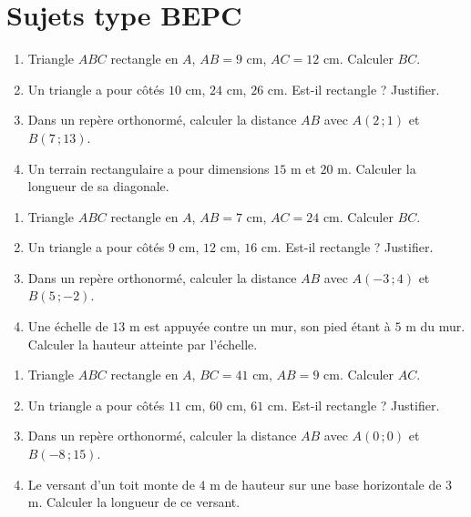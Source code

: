 \section{Sujets type BEPC}

\begin{enumerate}[label=\arabic*)]
\item Triangle $ABC$ rectangle en $A$, $AB=9$ cm, $AC=12$ cm. Calculer $BC$.
\item Un triangle a pour côtés $10$ cm, $24$ cm, $26$ cm. Est-il rectangle ? Justifier.
\item Dans un repère orthonormé, calculer la distance $AB$ avec $A(2\,;1)$ et
$B(7\,;13)$.
\item Un terrain rectangulaire a pour dimensions $15$ m et $20$ m. Calculer la longueur de
sa diagonale.
\end{enumerate}

\begin{enumerate}[label=\arabic*)]
\item Triangle $ABC$ rectangle en $A$, $AB=7$ cm, $AC=24$ cm. Calculer $BC$.
\item Un triangle a pour côtés $9$ cm, $12$ cm, $16$ cm. Est-il rectangle ? Justifier.
\item Dans un repère orthonormé, calculer la distance $AB$ avec $A(-3\,;4)$ et
$B(5\,;-2)$.
\item Une échelle de $13$ m est appuyée contre un mur, son pied étant à $5$ m du mur.
Calculer la hauteur atteinte par l'échelle.
\end{enumerate}

\begin{enumerate}[label=\arabic*)]
\item Triangle $ABC$ rectangle en $A$, $BC=41$ cm, $AB=9$ cm. Calculer $AC$.
\item Un triangle a pour côtés $11$ cm, $60$ cm, $61$ cm. Est-il rectangle ? Justifier.
\item Dans un repère orthonormé, calculer la distance $AB$ avec $A(0\,;0)$ et
$B(-8\,;15)$.
\item Le versant d'un toit monte de $4$ m de hauteur sur une base horizontale de $3$ m.
Calculer la longueur de ce versant.
\end{enumerate}

